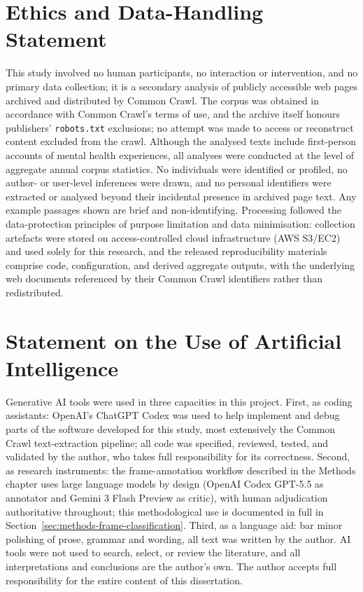 \documentclass[a4paper,oneside,12pt]{book}
\begin{document}
\chapter*{Ethics and Data-Handling Statement}
This study involved no human participants, no interaction or intervention, and no primary data collection; it is a secondary analysis of publicly accessible web pages archived and distributed by Common Crawl. The corpus was obtained in accordance with Common Crawl's terms of use, and the archive itself honours publishers' \texttt{robots.txt} exclusions; no attempt was made to access or reconstruct content excluded from the crawl. Although the analysed texts include first-person accounts of mental health experiences, all analyses were conducted at the level of aggregate annual corpus statistics. No individuals were identified or profiled, no author- or user-level inferences were drawn, and no personal identifiers were extracted or analysed beyond their incidental presence in archived page text. Any example passages shown are brief and non-identifying. Processing followed the data-protection principles of purpose limitation and data minimisation: collection artefacts were stored on access-controlled cloud infrastructure (AWS S3/EC2) and used solely for this research, and the released reproducibility materials comprise code, configuration, and derived aggregate outputs, with the underlying web documents referenced by their Common Crawl identifiers rather than redistributed.

\newpage

\chapter*{Statement on the Use of Artificial Intelligence}
Generative AI tools were used in three capacities in this project. First, as coding assistants: OpenAI's ChatGPT Codex was used to help implement and debug parts of the software developed for this study, most extensively the Common Crawl text-extraction pipeline; all code was specified, reviewed, tested, and validated by the author, who takes full responsibility for its correctness. Second, as research instruments: the frame-annotation workflow described in the Methods chapter uses large language models by design (OpenAI Codex GPT-5.5 as annotator and Gemini 3 Flash Preview as critic), with human adjudication authoritative throughout; this methodological use is documented in full in Section~\ref{sec:methods-frame-classification}. Third, as a language aid: bar minor polishing of prose, grammar and wording, all text was written by the author. AI tools were not used to search, select, or review the literature, and all interpretations and conclusions are the author's own. The author accepts full responsibility for the entire content of this dissertation.
\end{document}
